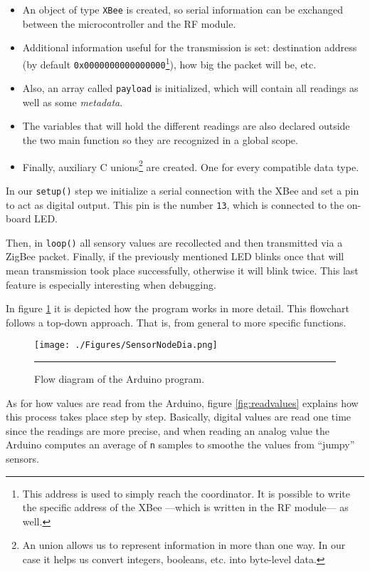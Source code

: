 \begin{itemize}
    \item An object of type \texttt{XBee} is created, so serial information can be exchanged between the microcontroller and the RF module. 
    \item Additional information useful for the transmission is set: destination address (by default \texttt{0x0000000000000000}\footnote{This address is used to simply reach the coordinator. It is possible to write the specific address of the XBee ---which is written in the RF module--- as well.}), how big the packet will be, etc.
    \item Also, an array called \texttt{payload} is initialized, which will contain all readings as well as some \emph{metadata}. 
    \item The variables that will hold the different readings are also declared outside the two main function so they are recognized in a global scope.
    \item Finally, auxiliary C unions\footnote{An union allows us to represent information in more than one way. In our case it helps us convert integers, booleans, etc. into byte-level data.} are created. One for every compatible data type.
\end{itemize}

In our \texttt{setup()} step we initialize a serial connection with the XBee\textregistered{} and set a pin to act as digital output. This pin is the number \texttt{13}, which is connected to the on-board LED.

Then, in \texttt{loop()} all sensory values are recollected and then transmitted via a ZigBee packet. Finally, if the previously mentioned LED blinks once that will mean transmission took place successfully, otherwise it will blink twice. This last feature is especially interesting when debugging.

In figure \ref{fig:ArduinoProgram} it is depicted how the program works in more detail. This flowchart follows a top-down approach. That is, from general to more specific functions.

\begin{figure}[htbp]
    \centering
        \texttt{[image: ./Figures/SensorNodeDia.png]}
        \rule{35em}{0.5pt}
    \caption[Flow diagram of an Arduino-based node]{Flow diagram of the Arduino program.}
    \label{fig:ArduinoProgram}
\end{figure}

As for how values are read from the Arduino, figure \ref{fig:readvalues} explains how this process takes place step by step. Basically, digital values are read one time since the readings are more precise, and when reading an analog value the Arduino computes an average of \texttt{n} samples to smoothe the values from ``jumpy'' sensors.

